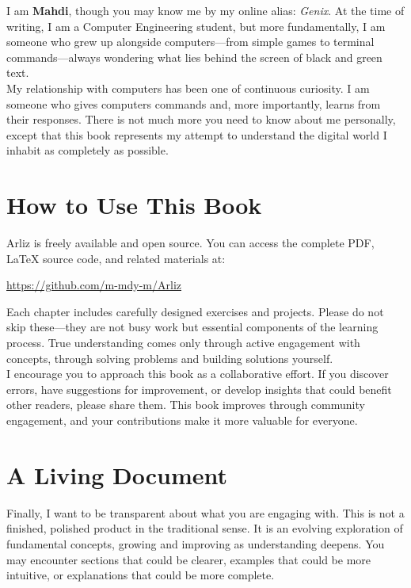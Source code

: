 I am \textbf{Mahdi}, though you may know me by my online alias: \emph{Genix}. At the time of writing, I am a Computer Engineering student, but more fundamentally, I am someone who grew up alongside computers—from simple games to terminal commands—always wondering what lies behind the screen of black and green text.\\

My relationship with computers has been one of continuous curiosity. I am someone who gives computers commands and, more importantly, learns from their responses. There is not much more you need to know about me personally, except that this book represents my attempt to understand the digital world I inhabit as completely as possible.\\

\section*{How to Use This Book}

Arliz is freely available and open source. You can access the complete PDF, LaTeX source code, and related materials at:

\begin{center}
	\url{https://github.com/m-mdy-m/Arliz}
\end{center}

Each chapter includes carefully designed exercises and projects. Please do not skip these—they are not busy work but essential components of the learning process. True understanding comes only through active engagement with concepts, through solving problems and building solutions yourself.\\

I encourage you to approach this book as a collaborative effort. If you discover errors, have suggestions for improvement, or develop insights that could benefit other readers, please share them. This book improves through community engagement, and your contributions make it more valuable for everyone.\\

\section*{A Living Document}

Finally, I want to be transparent about what you are engaging with. This is not a finished, polished product in the traditional sense. It is an evolving exploration of fundamental concepts, growing and improving as understanding deepens. You may encounter sections that could be clearer, examples that could be more intuitive, or explanations that could be more complete.\\

